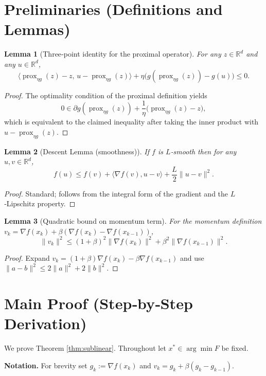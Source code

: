 \documentclass{article}
\newtheorem{lemma}{Lemma}
\newcommand{\prox}{\operatorname{prox}}
\newcommand{\R}{\mathbb{R}}
\begin{document}
\section*{Preliminaries (Definitions and Lemmas)}
\begin{lemma}[Three‑point identity for the proximal operator]\label{lem:prox}
For any $z\in\R^{d}$ and any $u\in\R^{d}$,
\[
\langle \prox_{\eta g}(z)-z,\,u-\prox_{\eta g}(z)\rangle
    +\eta\bigl(g(\prox_{\eta g}(z))-g(u)\bigr)\le 0.
\]
\end{lemma}
\begin{proof}
The optimality condition of the proximal definition yields
\[
0\in \partial g(\prox_{\eta g}(z))+\frac{1}{\eta}\bigl(\prox_{\eta g}(z)-z\bigr),
\]
which is equivalent to the claimed inequality after taking the inner product with $u-\prox_{\eta g}(z)$.
\end{proof}
\begin{lemma}[Descent Lemma (smoothness)]\label{lem:descent}
If $f$ is $L$‑smooth then for any $u,v\in\R^{d}$,
\[
f(u)\le f(v)+\langle\nabla f(v),u-v\rangle+\frac{L}{2}\|u-v\|^{2}.
\]
\end{lemma}
\begin{proof}
Standard; follows from the integral form of the gradient and the $L$‑Lipschitz property.
\end{proof}
\begin{lemma}[Quadratic bound on momentum term]\label{lem:momentum}
For the momentum definition $v_{k}= \nabla f(x_{k})+\beta(\nabla f(x_{k})-\nabla f(x_{k-1}))$,
\[
\|v_{k}\|^{2}\le (1+\beta)^{2}\|\nabla f(x_{k})\|^{2}+\beta^{2}\|\nabla f(x_{k-1})\|^{2}.
\]
\end{lemma}
\begin{proof}
Expand $v_{k}= (1+\beta)\nabla f(x_{k})-\beta\nabla f(x_{k-1})$ and use $\|a-b\|^{2}\le 2\|a\|^{2}+2\|b\|^{2}$.
\end{proof}

\section*{Main Proof (Step‑by‑Step Derivation)}
We prove Theorem \ref{thm:sublinear}. Throughout let $x^{*}\in\arg\min F$ be fixed.

\noindent\textbf{Notation.} For brevity set $g_{k}:=\nabla f(x_{k})$ and $v_{k}=g_{k}+\beta(g_{k}-g_{k-1})$.
\end{document}
